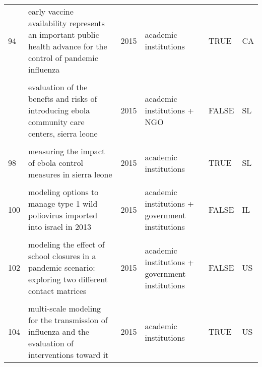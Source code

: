 \documentclass[
]{article}
\begin{document}
\begin{landscape}
\begin{longtable}{l>{\raggedright\arraybackslash}p{4cm}l>{\raggedright\arraybackslash}p{3.5cm}l>{\raggedright\arraybackslash}p{1.5cm}}
94 & early vaccine availability represents an important public health advance for the control of pandemic influenza & 2015 & academic institutions & TRUE & CA\\
\cellcolor{gray!6}{95} & \cellcolor{gray!6}{effectiveness of ebola treatment units and community care centers — liberia, september 23–october 31, 2014} & \cellcolor{gray!6}{2015} & \cellcolor{gray!6}{government institutions} & \cellcolor{gray!6}{FALSE} & \cellcolor{gray!6}{LR}\\
\addlinespace
96 & evaluation of the benefts and risks of introducing ebola community care centers, sierra leone & 2015 & academic institutions + NGO & FALSE & SL\\
\cellcolor{gray!6}{97} & \cellcolor{gray!6}{evidence for emergency vaccination having played a crucial role to control the 1965/66 foot-and-mouth disease outbreak in switzerland} & \cellcolor{gray!6}{2015} & \cellcolor{gray!6}{academic institutions + government institutions + NGO} & \cellcolor{gray!6}{FALSE} & \cellcolor{gray!6}{CH}\\
98 & measuring the impact of ebola control measures in sierra leone & 2015 & academic institutions & TRUE & SL\\
\cellcolor{gray!6}{99} & \cellcolor{gray!6}{media impact switching surface during an infectious disease outbreak} & \cellcolor{gray!6}{2015} & \cellcolor{gray!6}{academic institutions} & \cellcolor{gray!6}{TRUE} & \cellcolor{gray!6}{CN}\\
100 & modeling options to manage type 1 wild poliovirus imported into israel in 2013 & 2015 & academic institutions + government institutions & FALSE & IL\\
\addlinespace
\cellcolor{gray!6}{101} & \cellcolor{gray!6}{modeling the effect of comprehensive interventions on ebola virus transmission} & \cellcolor{gray!6}{2015} & \cellcolor{gray!6}{academic institutions} & \cellcolor{gray!6}{TRUE} & \cellcolor{gray!6}{GN LR SL}\\
102 & modeling the effect of school closures in a pandemic scenario: exploring two different contact matrices & 2015 & academic institutions + government institutions & FALSE & US\\
\cellcolor{gray!6}{103} & \cellcolor{gray!6}{modelling the effect of early detection of ebola} & \cellcolor{gray!6}{2015} & \cellcolor{gray!6}{academic institutions + government institutions} & \cellcolor{gray!6}{FALSE} & \cellcolor{gray!6}{west africa}\\
104 & multi-scale modeling for the transmission of influenza and the evaluation of interventions toward it & 2015 & academic institutions & TRUE & US\\

\end{longtable}
\end{landscape}
\end{document}
